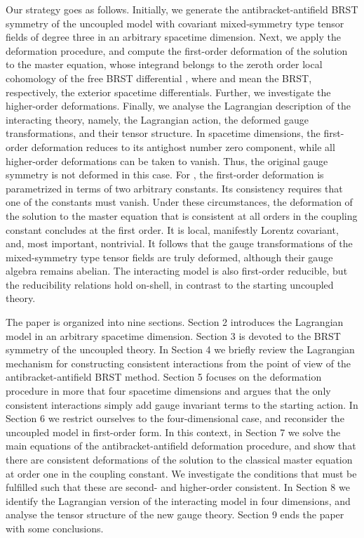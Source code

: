 \documentclass[a4paper,12pt]{article}
\begin{document}
Our strategy goes as follows. Initially, we generate the
antibracket-antifield BRST symmetry of the uncoupled model with covariant
mixed-symmetry type tensor fields of degree three in an arbitrary spacetime
dimension. Next, we apply the deformation procedure, and compute the
first-order deformation of the solution to the master equation, whose
integrand belongs to the zeroth order local cohomology of the free BRST
differential \coordHE{}, where \coordHE{} and \coordHE{} mean the BRST,
respectively, the exterior spacetime differentials. Further, we investigate
the higher-order deformations. Finally, we analyse the Lagrangian
description of the interacting theory, namely, the Lagrangian action, the
deformed gauge transformations, and their tensor structure. In \coordHE{}
spacetime dimensions, the first-order deformation reduces to its antighost
number zero component, while all higher-order deformations can be taken to
vanish. Thus, the original gauge symmetry is not deformed in this case. For \coordHE{}, the first-order deformation is parametrized in terms of two arbitrary
constants. Its consistency requires that one of the constants must vanish.
Under these circumstances, the deformation of the solution to the master
equation that is consistent at all orders in the coupling constant concludes
at the first order. It is local, manifestly Lorentz covariant, and, most
important, nontrivial. It follows that the gauge transformations of the
mixed-symmetry type tensor fields are truly deformed, although their gauge
algebra remains abelian. The interacting model is also first-order
reducible, but the reducibility relations hold on-shell, in contrast to the
starting uncoupled theory.

The paper is organized into nine sections. Section 2 introduces the
Lagrangian model in an arbitrary spacetime dimension. Section 3 is devoted
to the BRST symmetry of the uncoupled theory. In Section 4 we briefly review
the Lagrangian mechanism for constructing consistent interactions from the
point of view of the antibracket-antifield BRST method. Section 5 focuses on
the deformation procedure in more that four spacetime dimensions and argues
that the only consistent interactions simply add gauge invariant terms to
the starting action. In Section 6 we restrict ourselves to the
four-dimensional case, and reconsider the uncoupled model in first-order
form. In this context, in Section 7 we solve the main equations of the
antibracket-antifield deformation procedure, and show that there are
consistent deformations of the solution to the classical master equation at
order one in the coupling constant. We investigate the conditions that must
be fulfilled such that these are second- and higher-order consistent. In
Section 8 we identify the Lagrangian version of the interacting model in
four dimensions, and analyse the tensor structure of the new gauge theory.
Section 9 ends the paper with some conclusions.
\end{document}
